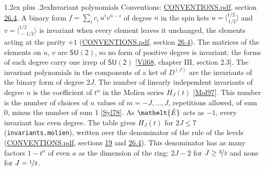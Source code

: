 \documentclass[10pt,a4paper]{article}
\makeatletter
\renewcommand\section{\@startsection{section}{1}{\z@}{-3ex plus -1ex minus -.2ex}%
  {1.2ex plus .2ex}{\normalfont\large\sffamily\bfseries\color{parttitle}}}
\numberwithin{equation}{section}
\newcommand{\eltfont}[1]{{\let\sigma\eltsigma\mathelt{#1}}}
\newcommand{\grp}[1]{\mathsf{#1}}
\newcommand{\elt}[1]{\eltfont{#1}}
\newcommand{\irrJ}[1]{D^{(#1)}}
\newcommand{\jm}[2]{\bigl\lvert{}^{#1}_{\,#2}\bigr\rangle}
\newcommand{\barred}[1]{\bar{#1}}
\makeatother
\begin{document}
\section{Invariant polynomials}\label{s:invariants}
Conventions: \href{../../CONVENTIONS.pdf}{CONVENTIONS.pdf}, section \href{../../CONVENTIONS.pdf\#conv.26.4}{26.4}.
\leavevmode\label{n:local.binary.form}A binary form $f = \sum_i c_i\, u^i v^{n-i}$ of degree $n$ in the spin kets $u = \jm{1/2}{1/2}$ and $v = \jm{1/2}{-1/2}$ is invariant when every element leaves it unchanged, the elements acting at the parity $+1$ (\href{../../CONVENTIONS.pdf}{CONVENTIONS.pdf}, section \href{../../CONVENTIONS.pdf\#conv.26.4}{26.4}). The matrices of the elements on $u$, $v$ are $\grp{SU(2)}$, so no form of positive degree is invariant: the forms of each degree carry one irrep of $\grp{SU(2)}$ [\href{../../../REFERENCES.pdf\#ref.Vil68}{Vil68}, chapter III, section 2.3].
The invariant polynomials in the components of a ket of $\irrJ{J}$ are the invariants of the binary form of degree $2J$. \label{n:function.hilbert}The number of linearly independent invariants of degree $n$ is the coefficient of $t^n$ in the Molien series $H_J(t)$ [\href{../../../REFERENCES.pdf\#ref.Mol97}{Mol97}]. This number is the number of choices of $n$ values of $m = -J, \dots, J$, repetitions allowed, of sum 0, minus the number of sum 1 [\href{../../../REFERENCES.pdf\#ref.Syl78}{Syl78}]. As $\elt{\barred{E}}$ acts as $-1$, every invariant has even degree. The table gives $H_J(t)$ for $2J \le 7$ (\texttt{invariants.molien}), written over the denominator of the rule of the levels (\href{../../CONVENTIONS.pdf}{CONVENTIONS.pdf}, sections \href{../../../rotation/CONVENTIONS.pdf\#conv.19}{19} and \href{../../CONVENTIONS.pdf\#conv.26.4}{26.4}). This denominator has as many factors $1 - t^{a}$ of even $a$ as the dimension of the ring: $2J - 2$ for $J \ge \nicefrac{3}{2}$ and none for $J = \nicefrac{1}{2}$.
\end{document}
